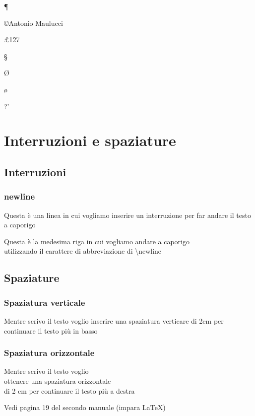 \documentclass{article}
\begin{document}
\P

\copyright Antonio Maulucci

\pounds 127

\S

\O

\o

?'

%

\newpage

\section{Interruzioni e spaziature}

\subsection{Interruzioni}

\subsubsection{newline}

Questa è una linea in cui vogliamo inserire un interruzione \newline per far andare il testo a caporigo

Questa è la medesima riga in cui vogliamo andare a caporigo \\ utilizzando il carattere di abbreviazione di \backslash newline

\subsection{Spaziature}

\subsubsection{Spaziatura verticale}

Mentre scrivo il testo voglio inserire una spaziatura verticare di 2cm \vspace{2cm} per continuare il testo più in basso

\subsubsection{Spaziatura orizzontale}

Mentre scrivo il testo voglio \\ ottenere una spaziatura orizzontale \\ di 2 cm \hspace{2cm} per continuare il testo più a destra

\vspace{72pt} %

Vedi pagina 19 del secondo manuale (impara \LaTeX)
\end{document}
